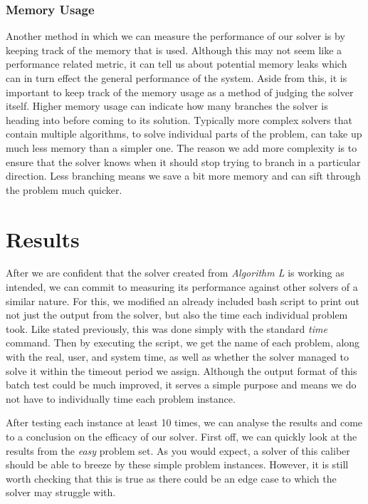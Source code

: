 \documentclass{article}
\begin{document}
\subsubsection{Memory Usage}
Another method in which we can measure the performance of our solver is by keeping track of the
memory that is used. Although this may not seem like a performance related metric, it can tell us
about potential memory leaks which can in turn effect the general performance of the system. Aside
from this, it is important to keep track of the memory usage as a method of judging the solver
itself. Higher memory usage can indicate how many branches the solver is heading into before coming
to its solution. Typically more complex solvers that contain multiple algorithms, to solve
individual parts of the problem, can take up much less memory than a simpler one. The reason we add
more complexity is to ensure that the solver knows when it should stop trying to branch in a
particular direction. Less branching means we save a bit more memory and can sift through the
problem much quicker.


\section{Results}
After we are confident that the solver created from \textit{Algorithm L} is working as intended, we can commit to measuring its
performance against other solvers of a similar nature. For this, we modified an already included bash script to print out not just
the output from the solver, but also the time each individual problem took. Like stated previously, this was done simply with the
standard \textit{time} command. Then by executing the script, we get the name of each problem, along with the real, user, and
system time, as well as whether the solver managed to solve it within the timeout period we assign. Although the output format of
this batch test could be much improved, it serves a simple purpose and means we do not have to individually time each problem
instance.

After testing each instance at least 10 times, we can analyse the results and come to a conclusion on the efficacy of our solver.
First off, we can quickly look at the results from the \textit{easy} problem set. As you would expect, a solver of this caliber
should be able to breeze by these simple problem instances. However, it is still worth checking that this is true as there could
be an edge case to which the solver may struggle with.
\end{document}
